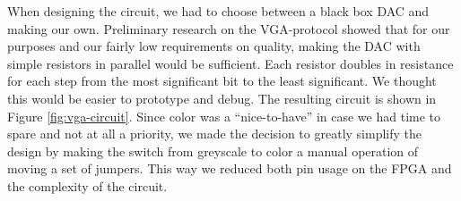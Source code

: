When designing the circuit, we had to choose between a black box \ac{DAC} and
making our own. Preliminary research on the \ac{VGA}-protocol showed that for
our purposes and our fairly low requirements on quality, making the \ac{DAC}
with simple resistors in parallel would be sufficient. Each resistor doubles in
resistance for each step from the most significant bit to the least
significant. We thought this would be easier to prototype and debug. The
resulting circuit is shown in Figure \ref{fig:vga-circuit}. Since color was a
``nice-to-have'' in case we had time to spare and not at all a priority, we made
the decision to greatly simplify the design by making the switch from greyscale
to color a manual operation of moving a set of jumpers. This way we reduced both
pin usage on the \ac{FPGA} and the complexity of the circuit.
